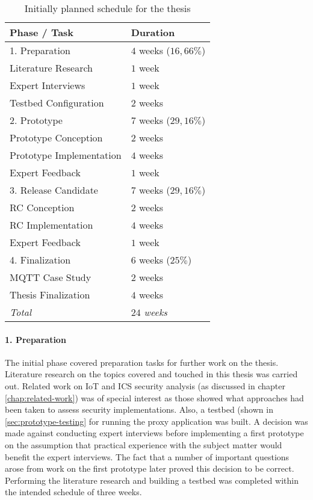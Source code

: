 \begin{table}
    \centering
    \begin{tabular}{l l}
        \toprule
        Phase / Task             & Duration              \\
        \midrule
        1. Preparation           & $4$ weeks ($16,66\%$) \\
        \midrule
        Literature Research      & $1$ week              \\
        Expert Interviews        & $1$ week              \\
        Testbed Configuration    & $2$ weeks             \\
        \midrule
        2. Prototype             & $7$ weeks ($29,16\%$) \\
        \midrule
        Prototype Conception     & $2$ weeks             \\
        Prototype Implementation & $4$ weeks             \\
        Expert Feedback          & $1$ week              \\
        \midrule
        3. Release Candidate     & $7$ weeks ($29,16\%$) \\
        \midrule
        RC Conception            & $2$ weeks             \\
        RC Implementation        & $4$ weeks             \\
        Expert Feedback          & $1$ week              \\
        \midrule
        4. Finalization          & $6$ weeks ($25\%$)    \\
        \midrule
        MQTT Case Study          & $2$ weeks             \\
        Thesis Finalization      & $4$ weeks             \\
        \midrule
        \midrule
        \emph{Total}             & \emph{$24$ weeks}     \\
        \bottomrule
    \end{tabular}
    \caption{Initially planned schedule for the thesis}
    \label{fig:thesis-schedule}
\end{table}

\paragraph{1. Preparation} The initial phase covered preparation tasks for further work on the thesis. Literature research on the topics covered and touched in this thesis was carried out. Related work on \ac{IoT} and \ac{ICS} security analysis (as discussed in chapter \ref{chap:related-work}) was of special interest as those showed what approaches had been taken to assess security implementations. Also, a testbed (shown in \ref{sec:prototype-testing} for running the proxy application was built. A decision was made against conducting expert interviews before implementing a first prototype on the assumption that practical experience with the subject matter would benefit the expert interviews. The fact that a number of important questions arose from work on the first prototype later proved this decision to be correct. Performing the literature research and building a testbed was completed within the intended schedule of three weeks.
